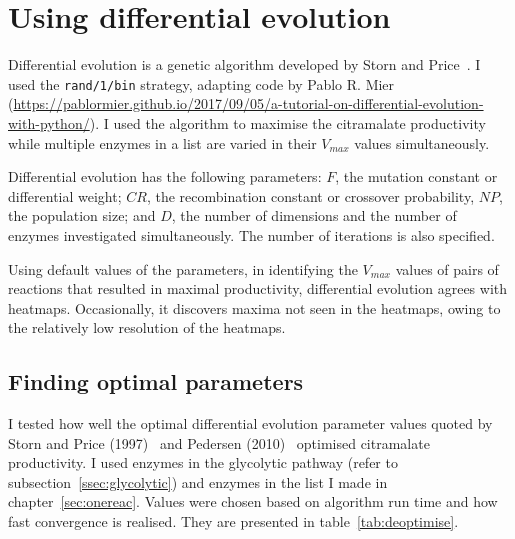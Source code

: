 \documentclass[parskip=full]{scrreprt}
\begin{document}
\section{Using differential evolution}
\label{sec:de}

Differential evolution is a genetic algorithm developed by Storn and Price~\cite{storn_differential_1997}. I used the \texttt{rand/1/bin} strategy, adapting code by Pablo R. Mier (\url{https://pablormier.github.io/2017/09/05/a-tutorial-on-differential-evolution-with-python/}). I used the algorithm to maximise the citramalate productivity while multiple enzymes in a list are varied in their $V_{max}$ values simultaneously.

Differential evolution has the following parameters: $F$, the mutation constant or differential weight; $CR$, the recombination constant or crossover probability, $NP$, the population size; and $D$, the number of dimensions and the number of enzymes investigated simultaneously. The number of iterations is also specified.

Using default values of the parameters, in identifying the $V_{max}$ values of pairs of reactions that resulted in maximal productivity, differential evolution agrees with heatmaps. Occasionally, it discovers maxima not seen in the heatmaps, owing to the relatively low resolution of the heatmaps.

\subsection{Finding optimal parameters}
\label{ssec:deoptimise}

I tested how well the optimal differential evolution parameter values quoted by Storn and Price (1997)~\cite{storn_differential_1997} and Pedersen (2010)~\cite{pedersen_good_2010} optimised citramalate productivity. I used enzymes in the glycolytic pathway (refer to subsection~\vref{ssec:glycolytic}) and enzymes in the list I made in chapter~\vref{sec:onereac}. Values were chosen based on algorithm run time and how fast convergence is realised. They are presented in table~\vref{tab:deoptimise}.
\end{document}
